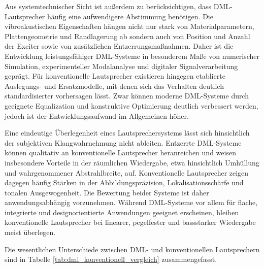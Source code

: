 Aus systemtechnischer Sicht ist außerdem zu berücksichtigen, dass DML-Lautsprecher häufig eine aufwendigere Abstimmung benötigen. Die vibroakustischen Eigenschaften hängen nicht nur stark von Materialparametern, Plattengeometrie und Randlagerung ab sondern auch von Position und Anzahl der Exciter sowie von zusätzlichen Entzerrungsmaßnahmen. Daher ist die Entwicklung leistungsfähiger DML-Systeme in besonderem Maße von numerischer Simulation, experimenteller Modalanalyse und digitaler Signalverarbeitung geprägt.
Für konventionelle Lautsprecher existieren hingegen etablierte Auslegungs- und Ersatzmodelle, mit denen sich das Verhalten deutlich standardisierter vorhersagen lässt. Zwar können moderne DML-Systeme durch geeignete Equalization und konstruktive Optimierung deutlich verbessert werden, jedoch ist der Entwicklungsaufwand im Allgemeinen höher.


Eine eindeutige Überlegenheit eines Lautsprechersystems lässt sich hinsichtlich der subjektiven Klangwahrnehmung nicht ableiten. Entzerrte DML-Systeme können qualitativ an konventionelle Lautsprecher heranreichen und weisen insbesondere Vorteile in der räumlichen Wiedergabe, etwa hinsichtlich Umhüllung und wahrgenommener Abstrahlbreite, auf. Konventionelle Lautsprecher zeigen dagegen häufig Stärken in der Abbildungspräzision, Lokalisationsschärfe und tonalen Ausgewogenheit. Die Bewertung beider Systeme ist daher anwendungsabhängig vorzunehmen. Während DML-Systeme vor allem für flache, integrierte und designorientierte Anwendungen geeignet erscheinen, bleiben konventionelle Lautsprecher bei linearer, pegelfester und bassstarker Wiedergabe meist überlegen.

Die wesentlichen Unterschiede zwischen DML- und konventionellen Lautsprechern sind in Tabelle \ref{tab:dml_konventionell_vergleich} zusammengefasst.

